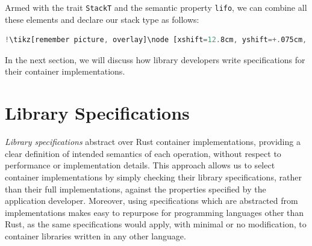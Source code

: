 Armed with the trait \lstinline{StackT} and the semantic property \lstinline|lifo|, we can combine all these elements and declare our stack type as follows:
\begin{lstlisting}[language=Rust, style=boxed, escapechar=!]
!\tikz[remember picture, overlay]\node [xshift=12.8cm, yshift=+.075cm, inner sep=0.075cm, rectangle] {\footnotesize\bfseries\texttt{Primrose}};!type StackCon<T> = {c <: (ContainerT, StackT) | (lifo c)}
\end{lstlisting}

In the next section, we will discuss how library developers write specifications for their container implementations.


\section{Library Specifications}
\label{chap2:lib}
%
\emph{Library specifications} abstract over Rust container implementations, providing a clear definition of intended semantics of each operation, without respect to performance or implementation details. 
This approach allows us to select container implementations by simply checking their library specifications, rather than their full implementations, against the properties specified by the application developer.
Moreover, using specifications which are abstracted from implementations makes \Primrose{} easy to repurpose for programming languages other than Rust, as the same specifications would apply, with minimal or no modification, to container libraries written in any other language. 

